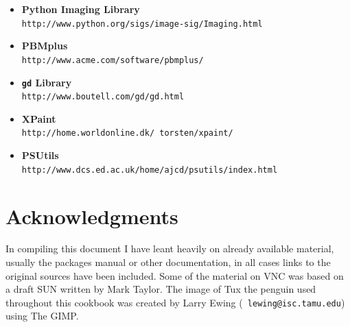 \documentclass[twoside,11pt]{article}
\newcommand{\htmladdnormallink}[2]{#1}
\newcommand{\htmlref}[2]{#1}
\newcommand{\xlabel}[1]{}
\begin{document}
\begin{itemize}
\item {\bf\label{sc15_available_pythonimg}Python Imaging Library}\\
\htmladdnormallink{{\tt http://www.python.org/sigs/image-sig/Imaging.html}}{http://www.python.org/sigs/image-sig/Imaging.html}

\item {\bf\label{sc15_available_pbmplus}PBMplus}\\
\htmladdnormallink{{\tt http://www.acme.com/software/pbmplus/}}{http://www.acme.com/software/pbmplus/}

\item {\bf\label{sc15_available_gd}{\tt gd} Library}\\
\htmladdnormallink{{\tt http://www.boutell.com/gd/gd.html}}{http://www.boutell.com/gd/gd.html}

\item {\bf\label{sc15_available_xpaint}{XPaint}}\\
\htmladdnormallink{{\tt http://home.worldonline.dk/~torsten/xpaint/}}{http://home.worldonline.dk/~torsten/xpaint/}

\item {\bf\label{sc15_available_psutils}{PSUtils}}\\
\htmladdnormallink{{\tt http://www.dcs.ed.ac.uk/home/ajcd/psutils/index.html}}{http://www.dcs.ed.ac.uk/home/ajcd/psutils/index.html}

\end{itemize}

\section*{\xlabel{sc15_acks}Acknowledgments\label{sc15_acks}}

In compiling this document I have leant heavily on already available
material, usually the packages manual or other documentation, in all
cases links to the original sources have been included. Some of the
material on \htmlref{VNC}{sc15_vnc} was based on a draft SUN written
by \htmladdnormallink{Mark Taylor}{http://www.ast.cam.ac.uk/~mbt/}.
The image of \htmladdnormallink{Tux the
penguin}{http://www.woodsoup.org/projs/tux_aqfh/doc/index.html} used
throughout this cookbook was created by Larry Ewing
\htmladdnormallink{({\tt
lewing@isc.tamu.edu})}{mailto:lewing@isc.tamu.edu} using \htmlref{The
GIMP}{sc15_gimp}.
\end{document}
